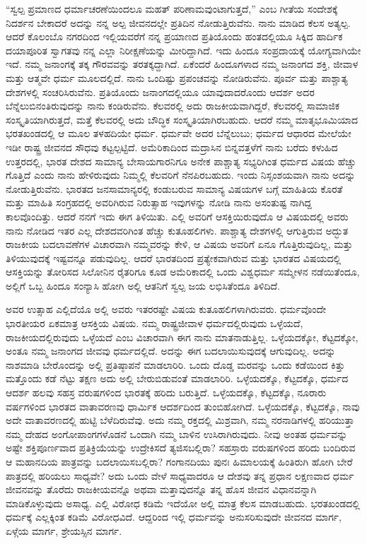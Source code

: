 \vskip 0.2cm

“ಸ್ವಲ್ಪ ಪ್ರಮಾಣದ ಧರ್ಮಾಚರಣೆಯಿಂದಲೂ ಮಹತ್​ ಪರಿಣಾಮವುಂಟಾಗುತ್ತದೆ,” ಎಂಬ ಗೀತೆಯ ಸಂದೇಶಕ್ಕೆ ನಿದರ್ಶನ ಬೇಕಾದರೆ ಅದನ್ನು ನನ್ನ ಅಲ್ಪ ಜೀವನದಲ್ಲೇ ಪ್ರತಿದಿನ ನೋಡುತ್ತಿರುವೆನು. ನಾನು ಮಾಡಿದ ಕೆಲಸ ಅತ್ಯಲ್ಪ. ಆದರೆ ಕೊಲಂಬೊ ನಗರದಿಂದ ಇಲ್ಲಿಯವರೆಗೆ ನನ್ನ ಪ್ರಯಾಣದ ಪ್ರತಿಯೊಂದು ಹಂತದಲ್ಲಿಯೂ ಸಿಕ್ಕಿದ ಹಾರ್ದಿಕ ದಯಾಪೂರಿತ ಸ್ವಾಗತವು ನನ್ನ ಎಲ್ಲಾ ನಿರೀಕ್ಷಣೆಯನ್ನು ಮೀರಿದ್ದಾಗಿದೆ. ಇದು ಹಿಂದೂ ಸಂಪ್ರದಾಯಕ್ಕೆ ಯೋಗ್ಯವಾಗಿಯೇ ಇದೆ. ನಮ್ಮ ಜನಾಂಗಕ್ಕೆ ತಕ್ಕ ಗೌರವವನ್ನು ತರತಕ್ಕದ್ದಾಗಿದೆ. ಏಕೆಂದರೆ ಹಿಂದೂಗಳಾದ ನಮ್ಮ ಜನಾಂಗದ ಶಕ್ತಿ, ಜೀವಾಳ ಮತ್ತು ಆತ್ಮವೇ ಧರ್ಮ ಮೂಲದಲ್ಲಿದೆ. ನಾನು ಒಂದಿಷ್ಟು ಪ್ರಪಂಚವನ್ನು ನೋಡಿರುವೆನು. ಪೂರ್ವ ಮತ್ತು ಪಾಶ್ಚಾತ್ಯ ದೇಶಗಳಲ್ಲಿ ಸಂಚರಿಸಿರುವೆನು. ಪ್ರತಿಯೊಂದು ಜನಾಂಗದಲ್ಲಿಯೂ ಯಾವುದಾದರೊಂದು ಆದರ್ಶ ಅದರ ಬೆನ್ನೆಲುಬಿನಂತಿರುವುದನ್ನು ನಾನು ಕಂಡಿರುವೆನು. ಕೆಲವರಲ್ಲಿ ಅದು ರಾಜಕೀಯವಾಗಿದ್ದರೆ, ಕೆಲವರಲ್ಲಿ ಸಾಮಾಜಿಕ ಸಂಸ್ಕೃತಿಯಾಗಿರುತ್ತದೆ, ಮತ್ತೆ ಕೆಲವರಲ್ಲಿ ಅದು ಬೌದ್ಧಿಕ ಸಂಸ್ಕೃತಿಯಾಗಿರಬಹುದು. ಆದರೆ ನಮ್ಮ ಮಾತೃಭೂಮಿಯಾದ ಭರತಖಂಡದಲ್ಲಿ ಆ ಮೂಲ ತಳಹದಿಯೇ ಧರ್ಮ. ಧರ್ಮವೇ ಅದರ ಬೆನ್ನೆಲುಬು; ಧರ್ಮದ ಆಧಾರದ ಮೇಲೆಯೇ ಇಡೀ ರಾಷ್ಟ್ರ ಜೀವನದ ಸೌಧವು ಕಟ್ಟಲ್ಪಟ್ಟಿದೆ. ಅಮೆರಿಕಾದಿಂದ ಮದ್ರಾಸಿನ ಬಿನ್ನವತ್ತಳೆಗೆ ನಾನು ಬರೆದು ಕಳುಹಿದ ಉತ್ತರದಲ್ಲಿ, ಭಾರತ ದೇಶದ ಸಾಮಾನ್ಯ ಬೇಸಾಯಗಾರನಿಗೂ ಅನೇಕ ಪಾಶ್ಚಾತ್ಯ ಸಭ್ಯರಿಗಿಂತ ಧರ್ಮದ ವಿಷಯ ಹೆಚ್ಚು ಗೊತ್ತಿದೆ ಎಂದು ನಾನು ಹೇಳಿರುವುದು ನಿಮ್ಮಲ್ಲಿ ಕೆಲವರಿಗೆ ನೆನಪಿರಬಹುದು. ಇಂದು ನಿಸ್ಸಂಶಯವಾಗಿ ನಾನು ಅದನ್ನು ನೋಡುತ್ತಿರುವೆನು. ಭಾರತದ ಜನಸಾಮಾನ್ಯರಲ್ಲಿ ಕಂಡುಬರುವ ಸಾಮಾನ್ಯ ವಿಷಯಗಳ ಬಗ್ಗೆ ಮಾಹಿತಿಯ ಕೊರತೆ ಮತ್ತು ಮಾಹಿತಿ ಸಂಗ್ರಹದಲ್ಲಿ ಅವರಿಗಿರುವ ನಿರುತ್ಸಾಹ ಇವುಗಳನ್ನು ನೋಡಿ ನಾನು ಅಸಂತುಷ್ಟ ನಾಗಿದ್ದ ಕಾಲವೊಂದಿತ್ತು. ಆದರೆ ನನಗೆ ಇದು ಈಗ ತಿಳಿಯಿತು. ಎಲ್ಲಿ ಅವರಿಗೆ ಆಸಕ್ತಿಯಿರುವುದೊ ಆ ವಿಷಯದಲ್ಲಿ ಅವರು ನಾನು ನೋಡಿದ ಇತರ ಎಲ್ಲ ದೇಶದವರಿಗಿಂತ ಹೆಚ್ಚು ಕುತೂಹಲಿಗಳು. ಪಾಶ್ಚಾತ್ಯ ದೇಶಗಳಲ್ಲಿ ಆಗುತ್ತಿರುವ ಅದ್ಭುತ ರಾಜಕೀಯ ಬದಲಾವಣೆಗಳ ವಿಚಾರವಾಗಿ ನಮ್ಮವರನ್ನು ಕೇಳಿ, ಆ ವಿಷಯ ಅವರಿಗೆ ಏನೂ ಗೊತ್ತಿರುವುದಿಲ್ಲ, ಮತ್ತು ತಿಳಿಯುವುದಕ್ಕೆ ಇಷ್ಟವನ್ನೂ ಪಡುವುದಿಲ್ಲ. ಆದರೆ ಭಾರತದಿಂದ ಪ್ರತ್ಯೇಕವಾಗಿರುವ ಮತ್ತು ಭಾರತದ ವಿಷಯದಲ್ಲಿ ಆಸಕ್ತಿಯನ್ನು ತೋರಿಸದ ಸಿಲೋನಿನ ರೈತರಿಗೂ ಕೂಡ ಅಮೆರಿಕಾದಲ್ಲಿ ಒಂದು ವಿಶ್ವಧರ್ಮ ಸಮ್ಮೇಳನ ನಡೆಯಿತೆಂದೂ, ಅಲ್ಲಿಗೆ ಒಬ್ಬ ಹಿಂದೂ ಸಂನ್ಯಾಸಿ ಹೋಗಿ ಅಲ್ಲಿ ಆತನಿಗೆ ಸ್ವಲ್ಪ ಜಯ ಲಭಿಸಿತೆಂದೂ ತಿಳಿದಿದೆ.

ಅವರ ಉತ್ಸಾಹ ಎಲ್ಲಿದೆಯೊ ಅಲ್ಲಿ ಅವರು ಇತರರಷ್ಟೇ ವಿಷಯ ಕುತೂಹಲಿಗಳಾಗಿರುವರು. ಧರ್ಮವೊಂದೇ ಭಾರತೀಯರ ಏಕಮಾತ್ರ ಆಸಕ್ತಿಯ ವಿಷಯ. ನಮ್ಮ ರಾಷ್ಟ್ರಜೀವಾಳ ಧರ್ಮದಲ್ಲಿರುವುದು ಒಳ್ಳೆಯದೆ, ರಾಜಕೀಯದಲ್ಲಿರುವುದು ಒಳ್ಳೆಯದೆ ಎಂಬ ವಿಚಾರವಾಗಿ ಈಗ ನಾನು ಮಾತನಾಡುತ್ತಿಲ್ಲ. ಒಳ್ಳೆಯದಕ್ಕೋ, ಕೆಟ್ಟದಕ್ಕೋ, ಅಂತೂ ನಮ್ಮ ಜನಾಂಗದ ಜೀವವು ಧರ್ಮದಲ್ಲಿದೆ. ಅದನ್ನು ಈಗ ಬದಲಾಯಿಸುವುದಕ್ಕೆ ಆಗುವುದಿಲ್ಲ. ಅದನ್ನು ನಾಶಮಾಡಿ ಬೇರೊಂದನ್ನು ಅಲ್ಲಿ ಪ್ರತಿಷ್ಠಾಪನೆ ಮಾಡಲಾರಿರಿ. ಒಂದು ದೊಡ್ಡ ಮರವನ್ನು ಒಂದು ಕಡೆಯಿಂದ ಕಿತ್ತು ಮತ್ತೊಂದು ಕಡೆ ನೆಟ್ಟು ತಕ್ಷಣ ಅದು ಅಲ್ಲಿ ಬೇರುಬಿಡುವಂತೆ ಮಾಡಲಾರಿರಿ. ಒಳ್ಳೆಯದಕ್ಕೊ, ಕೆಟ್ಟದಕ್ಕೊ, ಧರ್ಮದ ಆದರ್ಶ ಹಲವು ಸಹಸ್ರ ವರುಷಗಳಿಂದ ಭಾರತಕ್ಕೆ ಹರಿದು ಬರುತ್ತಿದೆ. ಒಳ್ಳೆಯದಕ್ಕೊ, ಕೆಟ್ಟದಕ್ಕೊ, ನೂರಾರು ವರ್ಷಗಳಿಂದ ಭಾರತದ ವಾತಾವರಣವು ಧಾರ್ಮಿಕ ಆದರ್ಶದಿಂದ ತುಂಬಿಹೋಗಿದೆ. ಒಳ್ಳೆಯದಕ್ಕೊ, ಕೆಟ್ಟದಕ್ಕೊ, ನಾವು ಅದೇ ವಾತಾವರಣದಲ್ಲಿ ಹುಟ್ಟಿ ಬೆಳೆದಿರುವೆವು. ಅದು ನಮ್ಮ ರಕ್ತದಲ್ಲಿ ಮಿಶ್ರವಾಗಿ, ನಮ್ಮ ನರನಾಡಿಗಳಲ್ಲಿ ಹರಿಯುತ್ತಾ ನಮ್ಮ ದೇಹದ ಅಂಗೋಪಾಂಗಗಳೊಡನೆ ಒಂದಾಗಿ ನಮ್ಮ ಬಾಳಿನ ಉಸಿರಾಗಿರುವುದು. ನೀವು ಅಂತಹ ಧರ್ಮವನ್ನು ಅಷ್ಟೇ ಶಕ್ತಿಪೂರ್ಣವಾದ ಪ್ರತಿಕ್ರಿಯೆಯನ್ನು ಉದ್ರೇಕಿಸದೆ ತ್ಯಜಿಸಬಲ್ಲಿರಾ? ಸಹಸ್ರಾರು ವರುಷಗಳಿಂದ ಹರಿದು ಬಂದಿರುವ ಆ ಮಹಾನದಿಯ ಪಾತ್ರವನ್ನು ಬದಲಾಯಿಸಬಲ್ಲಿರಾ? ಗಂಗಾನದಿಯು ಪುನಃ ಹಿಮಾಲಯಕ್ಕೆ ಹಿಂತಿರುಗಿ ಹೋಗಿ ಬೇರೆ ಪಾತ್ರದಲ್ಲಿ ಹರಿಯಲು ಸಾಧ್ಯವೇ? ಅದು ಒಂದು ವೇಳೆ ಸಾಧ್ಯವಾದರೂ ಆ ದೇಶವು ತನ್ನ ಪ್ರಧಾನ ಲಕ್ಷಣವಾದ ಧರ್ಮ ಜೀವನವನ್ನು ತೊರೆದು ರಾಜಕೀಯವನ್ನೊ ಅಥವಾ ಮತ್ತಾವುದನ್ನೊ ತನ್ನ ಹೊಸ ಜೀವನ ವಿಧಾನವನ್ನಾಗಿ ಮಾಡಿಕೊಳ್ಳುವುದು ಅಸಾಧ್ಯ. ಎಲ್ಲಿ ವಿರೋಧ ಕಡಿಮೆ ಇದೆಯೋ ಅಲ್ಲಿ ಮಾತ್ರ ಕೆಲಸ ಮಾಡಬಹುದು. ಭರತಖಂಡದಲ್ಲಿ ಧರ್ಮಕ್ಕೆ ಎಲ್ಲಕ್ಕಿಂತ ಕಡಿಮೆ ವಿರೋಧವಿದೆ. ಆದ್ದರಿಂದ ಇಲ್ಲಿ ಧರ್ಮವನ್ನು ಅನುಸರಿಸುವುದೇ ಜೀವನದ ಮಾರ್ಗ, ಏಳ್ಗೆಯ ಮಾರ್ಗ, ಶ್ರೇಯಸ್ಸಿನ ಮಾರ್ಗ.

